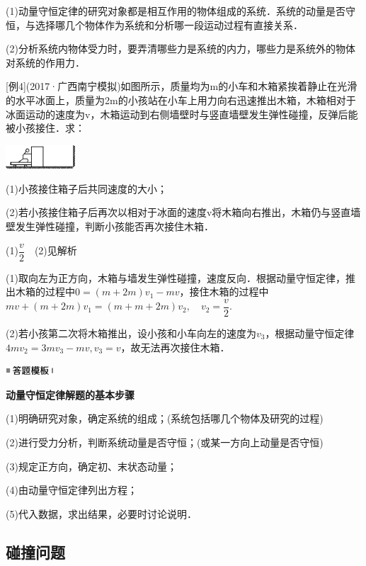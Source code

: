 (1)动量守恒定律的研究对象都是相互作用的物体组成的系统．系统的动量是否守恒，与选择哪几个物体作为系统和分析哪一段运动过程有直接关系．

(2)分析系统内物体受力时，要弄清哪些力是系统的内力，哪些力是系统外的物体对系统的作用力．

{[}例4{]}(2017·广西南宁模拟)如图所示，质量均为m的小车和木箱紧挨着静止在光滑的水平冰面上，质量为2m的小孩站在小车上用力向右迅速推出木箱，木箱相对于冰面运动的速度为v，木箱运动到右侧墙壁时与竖直墙壁发生弹性碰撞，反弹后能被小孩接住．求：

\begin{center}\includegraphics[width=1.01875in,height=0.34931in]{media/image251.png}\end{center}

(1)小孩接住箱子后共同速度的大小；

(2)若小孩接住箱子后再次以相对于冰面的速度v将木箱向右推出，木箱仍与竖直墙壁发生弹性碰撞，判断小孩能否再次接住木箱．
\begin{solution}
	(1)$\dfrac{v}{2}$　(2)见解析
	
	(1)取向左为正方向，木箱与墙发生弹性碰撞，速度反向．根据动量守恒定律，推出木箱的过程中$0=(m+2 m) v_{1}-mv$，接住木箱的过程中$m v+(m+2 m) v_{1}=(m+m+2 m) v_{2}, \quad v_{2}=\dfrac{v}{2}$.

(2)若小孩第二次将木箱推出，设小孩和小车向左的速度为$v_3$，根据动量守恒定律$4 m v_{2}=3 m v_{3}-m v, v_{3}=v$，故无法再次接住木箱．
\end{solution}


\begin{center}\includegraphics[width=0.70764in,height=0.12292in]{media/image25.png}

\textbf{动量守恒定律解题的基本步骤}
\end{center}


(1)明确研究对象，确定系统的组成；(系统包括哪几个物体及研究的过程)

(2)进行受力分析，判断系统动量是否守恒；(或某一方向上动量是否守恒)

(3)规定正方向，确定初、末状态动量；

(4)由动量守恒定律列出方程；

(5)代入数据，求出结果，必要时讨论说明．
\newpage
\subsection{碰撞问题}

